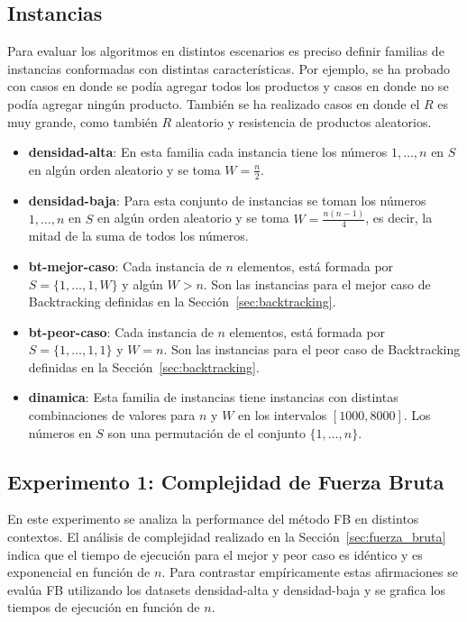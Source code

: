 \documentclass[10pt,a4paper]{article}
\begin{document}
\subsection{Instancias}
Para evaluar los algoritmos en distintos escenarios es preciso definir familias de instancias conformadas con distintas características. Por ejemplo, se ha probado con casos en donde se pod\'ia agregar todos los productos y casos en donde no se pod\'ia agregar ning\'un producto. Tambi\'en se ha realizado casos en donde el $R$ es muy grande, como tambi\'en $R$ aleatorio y resistencia de productos aleatorios.
\begin{itemize}
    \setlength{\itemsep}{1pt}
    \setlength{\parskip}{0pt}
    \setlength{\parsep}{0pt}
    \item \textbf{densidad-alta}: En esta familia cada instancia tiene los números $1, \hdots, n$ en $S$ en algún orden aleatorio y se toma $W = \frac{n}{2}$.
    \item \textbf{densidad-baja}: Para esta conjunto de instancias se toman los números $1, \hdots, n$ en $S$ en algún orden aleatorio y se toma $W = \frac{n (n-1)}{4}$, es decir, la mitad de la suma de todos los números.
    \item \textbf{bt-mejor-caso}: Cada instancia de $n$ elementos, está formada por $S = \{1, \hdots, 1, W\}$ y algún $W > n$. Son las instancias para el mejor caso de Backtracking definidas en la Sección~\ref{sec:backtracking}.
    \item \textbf{bt-peor-caso}: Cada instancia de $n$ elementos, está formada por $S = \{1, \hdots, 1, 1\}$ y $W = n$. Son las instancias para el peor caso de Backtracking definidas en la Sección~\ref{sec:backtracking}.
    \item \textbf{dinamica}: Esta familia de instancias tiene instancias con distintas combinaciones de valores para $n$ y $W$ en los intervalos $[1000, 8000]$. Los números en $S$ son una permutación de el conjunto $\{1, \hdots, n\}$.
\end{itemize}

\subsection{Experimento 1: Complejidad de Fuerza Bruta}
En este experimento se analiza la performance del método FB en distintos contextos. El análisis de complejidad realizado en la Sección~\ref{sec:fuerza_bruta} indica que el tiempo de ejecución para el mejor y peor caso es idéntico y es exponencial en función de $n$. Para contrastar empíricamente estas afirmaciones se evalúa FB utilizando los datasets densidad-alta y densidad-baja y se grafica los tiempos de ejecución en función de $n$. 
\end{document}
